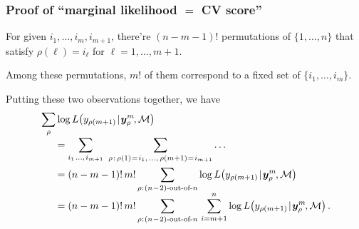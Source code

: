 \documentclass[18pt, handout]{beamer}
\newcommand{\defineTightSpacing}{%
	\setlength{\abovedisplayskip}{.25\baselineskip}%
	\setlength{\belowdisplayskip}{.25\baselineskip}%
}
\newcommand{\given}{\thinnerspace | \thinnerspace}
\newcommand{\spacedColon}{\mkern .5mu : \mkern 1mu}
\newcommand{\spacedEq}{\mkern 1mu = \mkern 1.5mu}
\newcommand{\thinnerspace}{\mskip.5\thinmuskip}
\newcommand{\negthinnerspace}{\mskip-.5\thinmuskip}
\newcommand{\likelihood}{L}
\newcommand{\by}{\bm{y}}
\newcommand{\modelSymbol}{\mathcal{M}}
\newcommand{\permutation}{\rho}
\newcommand{\trainingSize}{m}
\newcommand{\testSampleIndex}{i}
\begin{document}
\begin{frame}
\frametitle{Proof of ``marginal likelihood $=$ {\large CV} score''}
%

For given $\testSampleIndex_1, \ldots, \testSampleIndex_\trainingSize, \testSampleIndex_{\trainingSize + 1}$, there're $(n - \trainingSize - 1)!$ permutations of $\{1, \ldots, n\}$ that satisfy $\permutation(\ell) = \testSampleIndex_\ell$ for $\ell = 1, \ldots, \trainingSize + 1$.

Among these permutations, $\trainingSize!$ of them correspond to a fixed set of $\{ \testSampleIndex_1, \ldots, \testSampleIndex_\trainingSize \}$.

Putting these two observations together, we have
\vspace*{-.15\baselineskip}
\begin{equation*} %
\begin{aligned}
&\sum_\permutation \log \likelihood\!\left(y_{\permutation(\trainingSize + 1)} \given \by_\permutation^\trainingSize\negthinnerspace, \modelSymbol \right) \\[-.2\baselineskip]
&\hspace*{1.5em}= \sum_{\testSampleIndex_1 \thinnerspace \ldots, \thinnerspace \testSampleIndex_{\trainingSize + 1}} \ 
	\sum_{\permutation \thinnerspace : \, \permutation(1) \spacedEq \testSampleIndex_1, \, \ldots, \, \permutation(\trainingSize + 1) \spacedEq \testSampleIndex_{\trainingSize + 1}} \ldots \\
&\hspace*{1.5em}= (n - \trainingSize - 1)! \, \trainingSize! 
	\sum_{\permutation \spacedColon \text{$(n\!-\!2)$-out-of-$n$}} \log \likelihood\!\left(y_{\permutation(\trainingSize + 1)} \given \by_\permutation^\trainingSize\negthinnerspace, \modelSymbol \right) \\[-.3\baselineskip]
&\hspace*{1.5em}= (n - \trainingSize - 1)! \, \trainingSize! 
	\sum_{\permutation \spacedColon \text{$(n\!-\!2)$-out-of-$n$}} \, \sum_{\testSampleIndex = \trainingSize + 1}^n
		\log \likelihood\!\left(y_{\permutation(\trainingSize + 1)} \given \by_\permutation^\trainingSize\negthinnerspace, \modelSymbol \right).
\end{aligned}
\end{equation*}
\end{frame}
\end{document}
